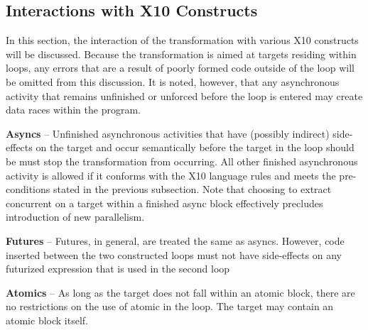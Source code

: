 \subsection{Interactions with X10 Constructs}

In this section, the interaction of the transformation with various
X10 constructs will be discussed. Because the transformation is
aimed at targets residing within loops, any errors that are a
result of poorly formed code outside of the loop will be omitted from
this discussion. It is noted, however, that any asynchronous activity
that remains unfinished or unforced before the loop is entered may
create data races within the program.

{\bf Asyncs} -- %
Unfinished
asynchronous activities that have (possibly indirect) side-effects on
the target and occur semantically before the target in the loop should be
must stop the transformation from occurring.
All other finished
asynchronous activity is allowed if it conforms with the X10 language
rules and meets the pre-conditions stated
in the previous subsection. Note that choosing to extract concurrent on
a target within a finished async block effectively precludes
introduction of new parallelism.

{\bf Futures} -- Futures, in general, are treated the same as asyncs.
However, code inserted between the two
constructed loops must not have side-effects on any futurized expression that
is used in the second loop

 {\bf Atomics} -- As long as the target does not fall
within an atomic block, there are no restrictions on the use of atomic in the
loop. The target may contain an atomic block itself.

